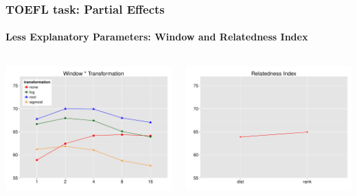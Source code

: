 \documentclass[t]{beamer} %
\begin{document}
\begin{frame}
  \frametitle{TOEFL task: Partial Effects}
  \framesubtitle{Less Explanatory Parameters: Window and Relatedness Index}
  \begin{columns}

    \begin{column}{0.5\textwidth}
      \centering
      \hspace*{-18pt}   \includegraphics[scale=0.30]{img/lapesa_toefl_main_window_transformation}

    \end{column}
    \begin{column}{0.5\textwidth}
      \hspace*{-18pt} 
      \includegraphics[scale=0.30]{img/lapesa_toefl_main_relindex}
    \end{column}
  \end{columns}
  
\end{frame}
\end{document}
